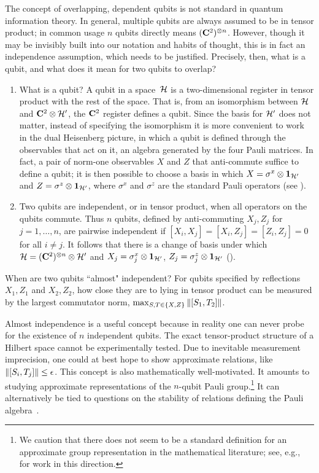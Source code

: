 \documentclass[11pt]{article}
\begin{document}
The concept of overlapping, dependent qubits is not standard in quantum information theory.  In general, multiple qubits are always assumed to be in tensor product; in common usage $n$ qubits directly {means} $({\bf C}^2)^{\otimes n}$.  However, though it may be invisibly built into our notation and habits of thought, this is in fact an independence assumption, which needs to be justified.  Precisely, then, what is a qubit, and what does it mean for two qubits to overlap?  
\begin{enumerate}
\item 
What is a qubit?  A qubit in a space~${\mathcal H}$ is a two-dimensional register in tensor product with the rest of the space.  That is, from an isomorphism between ${\mathcal H}$ and ${\bf C}^2 \otimes {\mathcal H}'$, the ${\bf C}^2$ register defines a qubit.  Since the basis for ${\mathcal H}'$ does not matter, instead of specifying the isomorphism it is more convenient to work in the dual Heisenberg picture, in which a qubit is defined through the observables that act on it, an algebra generated by the four Pauli matrices.  In fact, a pair of norm-one observables $X$ and $Z$ that anti-commute suffice to define a qubit; it is then possible to choose a basis in which $X = \sigma^x \otimes \boldsymbol{1}_{{\mathcal H}'}$ and $Z = \sigma^z \otimes \boldsymbol{1}_{{\mathcal H}'}$, where $\sigma^x$ and $\sigma^z$ are the standard Pauli operators (see ).  
\item 
Two qubits are independent, or in tensor product, when all operators on the qubits commute.  Thus $n$ qubits, defined by anti-commuting $X_j, Z_j$ for $j = 1, \ldots, n$, are pairwise independent if $[X_i, X_j] = [X_i, Z_j] = [Z_i, Z_j] = 0$ for all $i \neq j$.  It follows that there is a change of basis under which ${\mathcal H} = ({\bf C}^2)^{\otimes n} \otimes {\mathcal H}'$ and $X_j = \sigma^x_j \otimes \boldsymbol{1}_{{\mathcal H}'}$, $Z_j = \sigma^z_j \otimes \boldsymbol{1}_{{\mathcal H}'}$ ().  
\end{enumerate}

When are two qubits ``almost" independent?  For qubits specified by reflections $X_1, Z_1$ and $X_2, Z_2$, how close they are to lying in tensor product can be measured by the largest commutator norm, $\max_{S, T \in \{X, Z\}} {\| [S_1, T_2] \|}$.  

Almost independence is a useful concept because in reality one can never probe for the existence of $n$ independent qubits.  The exact tensor-product structure of a Hilbert space cannot be experimentally tested.  Due to inevitable measurement imprecision, one could at best hope to show approximate relations, like ${\| [S_i, T_j] \|} \leq \epsilon$.  This concept is also mathematically well-motivated.  It amounts to studying approximate representations of the $n$-qubit Pauli group.\footnote{We caution that there does not seem to be a standard definition for an approximate group representation in the mathematical literature; see, e.g.,~\cite{BabaiFriedl91approximate, MooreRussell15approximate} for work in this direction.}  It can alternatively be tied to questions on the stability of relations defining the Pauli algebra~\cite{Loring93cstar}.  
\end{document}
